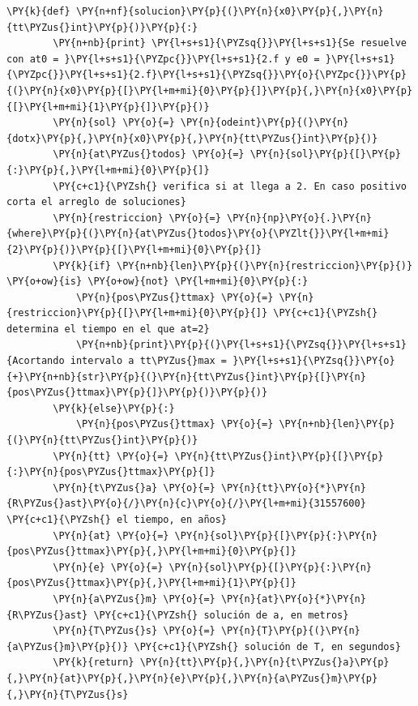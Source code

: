 \begin{tcolorbox}[breakable, size=fbox, boxrule=1pt, pad at break*=1mm,colback=cellbackground, colframe=cellborder]
    \begin{Verbatim}[commandchars=\\\{\}]
    \PY{k}{def} \PY{n+nf}{solucion}\PY{p}{(}\PY{n}{x0}\PY{p}{,}\PY{n}{tt\PYZus{}int}\PY{p}{)}\PY{p}{:}
        \PY{n+nb}{print} \PY{l+s+s1}{\PYZsq{}}\PY{l+s+s1}{Se resuelve con at0 = }\PY{l+s+s1}{\PYZpc{}}\PY{l+s+s1}{2.f y e0 = }\PY{l+s+s1}{\PYZpc{}}\PY{l+s+s1}{2.f}\PY{l+s+s1}{\PYZsq{}}\PY{o}{\PYZpc{}}\PY{p}{(}\PY{n}{x0}\PY{p}{[}\PY{l+m+mi}{0}\PY{p}{]}\PY{p}{,}\PY{n}{x0}\PY{p}{[}\PY{l+m+mi}{1}\PY{p}{]}\PY{p}{)}
        \PY{n}{sol} \PY{o}{=} \PY{n}{odeint}\PY{p}{(}\PY{n}{dotx}\PY{p}{,}\PY{n}{x0}\PY{p}{,}\PY{n}{tt\PYZus{}int}\PY{p}{)}
        \PY{n}{at\PYZus{}todos} \PY{o}{=} \PY{n}{sol}\PY{p}{[}\PY{p}{:}\PY{p}{,}\PY{l+m+mi}{0}\PY{p}{]}
        \PY{c+c1}{\PYZsh{} verifica si at llega a 2. En caso positivo corta el arreglo de soluciones}
        \PY{n}{restriccion} \PY{o}{=} \PY{n}{np}\PY{o}{.}\PY{n}{where}\PY{p}{(}\PY{n}{at\PYZus{}todos}\PY{o}{\PYZlt{}}\PY{l+m+mi}{2}\PY{p}{)}\PY{p}{[}\PY{l+m+mi}{0}\PY{p}{]}
        \PY{k}{if} \PY{n+nb}{len}\PY{p}{(}\PY{n}{restriccion}\PY{p}{)} \PY{o+ow}{is} \PY{o+ow}{not} \PY{l+m+mi}{0}\PY{p}{:}
            \PY{n}{pos\PYZus{}ttmax} \PY{o}{=} \PY{n}{restriccion}\PY{p}{[}\PY{l+m+mi}{0}\PY{p}{]} \PY{c+c1}{\PYZsh{} determina el tiempo en el que at=2}
            \PY{n+nb}{print}\PY{p}{(}\PY{l+s+s1}{\PYZsq{}}\PY{l+s+s1}{Acortando intervalo a tt\PYZus{}max = }\PY{l+s+s1}{\PYZsq{}}\PY{o}{+}\PY{n+nb}{str}\PY{p}{(}\PY{n}{tt\PYZus{}int}\PY{p}{[}\PY{n}{pos\PYZus{}ttmax}\PY{p}{]}\PY{p}{)}\PY{p}{)}
        \PY{k}{else}\PY{p}{:} 
            \PY{n}{pos\PYZus{}ttmax} \PY{o}{=} \PY{n+nb}{len}\PY{p}{(}\PY{n}{tt\PYZus{}int}\PY{p}{)}
        \PY{n}{tt} \PY{o}{=} \PY{n}{tt\PYZus{}int}\PY{p}{[}\PY{p}{:}\PY{n}{pos\PYZus{}ttmax}\PY{p}{]}
        \PY{n}{t\PYZus{}a} \PY{o}{=} \PY{n}{tt}\PY{o}{*}\PY{n}{R\PYZus{}ast}\PY{o}{/}\PY{n}{c}\PY{o}{/}\PY{l+m+mi}{31557600} \PY{c+c1}{\PYZsh{} el tiempo, en años}
        \PY{n}{at} \PY{o}{=} \PY{n}{sol}\PY{p}{[}\PY{p}{:}\PY{n}{pos\PYZus{}ttmax}\PY{p}{,}\PY{l+m+mi}{0}\PY{p}{]}
        \PY{n}{e} \PY{o}{=} \PY{n}{sol}\PY{p}{[}\PY{p}{:}\PY{n}{pos\PYZus{}ttmax}\PY{p}{,}\PY{l+m+mi}{1}\PY{p}{]}
        \PY{n}{a\PYZus{}m} \PY{o}{=} \PY{n}{at}\PY{o}{*}\PY{n}{R\PYZus{}ast} \PY{c+c1}{\PYZsh{} solución de a, en metros}
        \PY{n}{T\PYZus{}s} \PY{o}{=} \PY{n}{T}\PY{p}{(}\PY{n}{a\PYZus{}m}\PY{p}{)} \PY{c+c1}{\PYZsh{} solución de T, en segundos}
        \PY{k}{return} \PY{n}{tt}\PY{p}{,}\PY{n}{t\PYZus{}a}\PY{p}{,}\PY{n}{at}\PY{p}{,}\PY{n}{e}\PY{p}{,}\PY{n}{a\PYZus{}m}\PY{p}{,}\PY{n}{T\PYZus{}s}
    \end{Verbatim}
    \end{tcolorbox}
